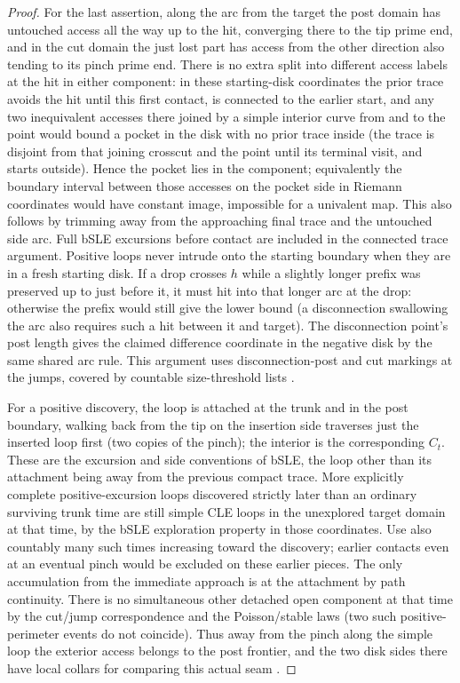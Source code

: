 \begin{proof}
For the last assertion, along the arc from the target the post domain has untouched access all the way up to the hit, converging there to the tip prime end, and in the cut domain the just lost part has access from the other direction also tending to its pinch prime end.
There is no extra split into different access labels at the hit in either component: in these starting-disk coordinates the prior trace avoids the hit until this first contact, is connected to the earlier start, and any two inequivalent accesses there joined by a simple interior curve from and to the point would bound a pocket in the disk with no prior trace inside (the trace is disjoint from that joining crosscut and the point until its terminal visit, and starts outside).
Hence the pocket lies in the component; equivalently the boundary interval between those accesses on the pocket side in Riemann coordinates would have constant image, impossible for a univalent map.
This also follows by trimming away from the approaching final trace and the untouched side arc.
Full bSLE excursions before contact are included in the connected trace argument.
Positive loops never intrude onto the starting boundary when they are in a fresh starting disk.
If a drop crosses \(h\) while a slightly longer prefix was preserved up to just before it, it must hit into that longer arc at the drop: otherwise the prefix would still give the lower bound (a disconnection swallowing the arc also requires such a hit between it and target).
The disconnection point's post length gives the claimed difference coordinate in the negative disk by the same shared arc rule.
This argument uses disconnection-post and cut markings at the jumps, covered by countable size-threshold lists \citep{MSWTrunk}.


For a positive discovery, the loop is attached at the trunk and in the post boundary, walking back from the tip on the insertion side traverses just the inserted loop first (two copies of the pinch); the interior is the corresponding \(C_t\).
These are the excursion and side conventions of bSLE, the loop other than its attachment being away from the previous compact trace.
More explicitly complete positive-excursion loops discovered strictly later than an ordinary surviving trunk time are still simple CLE loops in the unexplored target domain at that time, by the bSLE exploration property in those coordinates.
Use also countably many such times increasing toward the discovery; earlier contacts even at an eventual pinch would be excluded on these earlier pieces.
The only accumulation from the immediate approach is at the attachment by path continuity.
There is no simultaneous other detached open component at that time by the cut/jump correspondence and the Poisson/stable laws (two such positive-perimeter events do not coincide).
Thus away from the pinch along the simple loop the exterior access belongs to the post frontier, and the two disk sides there have local collars for comparing this actual seam \citep{MSWTrunk,MSWQuantum}.


\end{proof}
